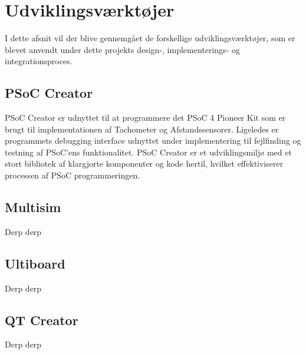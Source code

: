 \chapter{Udviklingsværktøjer} \label{ch:udviklingsvaerktoejer}
I dette afsnit vil der blive gennemgået de forskellige udviklingsværktøjer, som er blevet anvendt under dette projekts design-, implementerings- og integrationsproces.

\section{PSoC Creator}
PSoC Creator er udnyttet til at programmere det PSoC 4 Pioneer Kit som er brugt til implementationen af Tachometer og Afstandssensorer. Ligeledes er programmets debugging interface udnyttet under implementering til fejlfinding og testning af PSoC'ens funktionalitet.
PSoC Creator er et udviklingsmiljø med et stort bibliotek af klargjorte komponenter og kode hertil, hvilket effektiviserer processen af PSoC programmeringen.

\section{Multisim}
Derp derp

\section{Ultiboard}
Derp derp

\section{QT Creator}
Derp derp


